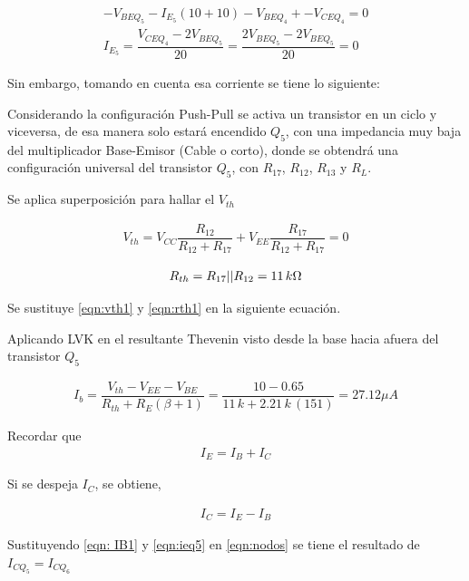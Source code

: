 \begin{enumerate}
        \begin{align*}
          -V_{BEQ_5}-I_{E_5}(10+10)-V_{BEQ_4} + -V_{CEQ_4} =0 \\[0.2cm]
          I_{E_5} = \dfrac{V_{CEQ_4}-2V_{BEQ_5}}{20}=\dfrac{2V_{BEQ_5}-2V_{BEQ_5}}{20}=0
        \end{align*}

        Sin embargo, tomando en cuenta esa corriente se tiene lo siguiente:

        Considerando la configuración Push-Pull se activa un transistor en un ciclo y viceversa, de esa manera solo estará encendido $Q_5$, con una impedancia muy baja del multiplicador Base-Emisor (Cable o corto), donde se obtendrá una configuración universal del transistor $Q_5$, con $R_{17}$, $R_{12}$, $R_{13}$ y $R_L$.

        Se aplica superposición para hallar el $V_{th}$

        \begin{gather}
          V_{th}=V_{CC}\dfrac{R_{12}}{R_{12}+R_{17}}+V_{EE}\dfrac{R_{17}}{R_{12}+R_{17}}=0
          \label{eqn:vth1}
        \end{gather}

        \begin{gather}
          R_{th}=R_{17}|| R_{12}=11\, k \ohm \label{eqn:rth1}
        \end{gather}

        Se sustituye \ref{eqn:vth1} y \ref{eqn:rth1} en la siguiente ecuación.

        Aplicando LVK en el resultante Thevenin visto desde la base hacia afuera del transistor $Q_5$

        \begin{gather}
          I_b=\dfrac{V_{th}-V_{EE}-V_{BE}}{R_{th}+R_E(\beta + 1)} =\dfrac{10-0.65}{11\, k +2.21\, k\,  (151) } = 27.12 \mu A \label{eqn: IB1}
        \end{gather}


        Recordar que
        \begin{gather}
          I_E=I_B+I_C \label{eqn:I_E}
        \end{gather}


        Si se despeja $I_C$, se obtiene,

        \begin{gather}
          I_C = I_E - I_B \label{eqn:nodos}
        \end{gather}

        Sustituyendo \ref{eqn: IB1} y \ref{eqn:ieq5} en \ref{eqn:nodos} se tiene el resultado de $I_{CQ_5}=I_{CQ_6}$


\end{enumerate}
